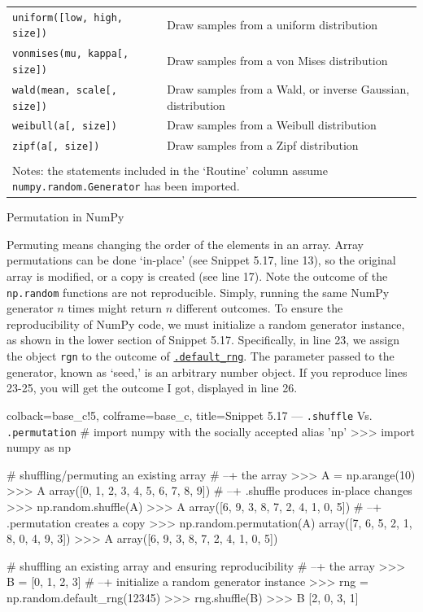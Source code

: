 \documentclass[a4paper,11pt]{book}
\newcommand{\question}[1]{%
    \begin{tcolorbox}[colback=comp_c!10,colframe=comp_c,sidebyside align=top,width=\linewidth,before skip=1ex]
        #1
    \end{tcolorbox}
    \switchcolumn%
}
\newcommand{\note}[1]{%
    \begin{tcolorbox}[colback=white!0,colframe=white!10,width=\linewidth,before skip=1ex]
        #1
    \end{tcolorbox}
}
\begin{document}
\begin{table}
\begin{tabular}{lp{12cm}}
\texttt{uniform([low, high, size])} &
                        Draw samples from a uniform distribution\\
\texttt{vonmises(mu, kappa[, size])} &
                        Draw samples from a von Mises distribution\\
\texttt{wald(mean, scale[, size])} &
                        Draw samples from a Wald, or inverse Gaussian, distribution\\
\texttt{weibull(a[, size])} &
                        Draw samples from a Weibull distribution\\
\texttt{zipf(a[, size])} &
                        Draw samples from a Zipf distribution\\
	     	\bottomrule \\[-1.8ex]
	        \multicolumn{2}{l}{Notes: the statements included in the `Routine' column assume \texttt{numpy.random.Generator} has been imported.} \\
	\end{tabular}
\end{table}
\clearpage

\begin{paracol}{2}
	\question{\raggedright Permutation in NumPy}
	\note{Permuting means changing the order of the elements in an array. Array permutations can be done `in-place' (see Snippet 5.17, line 13), so the original array is modified, or a copy is created (see line 17). Note the outcome of the \texttt{np.random} functions are not reproducible. Simply, running the same NumPy generator $n$ times might return $n$ different outcomes. To ensure the reproducibility of NumPy code, we must initialize a random generator instance, as shown in the lower section of Snippet 5.17. Specifically, in line 23, we assign the object \texttt{rgn} to the outcome of \href{https://numpy.org/doc/stable/reference/random/generator.html#numpy.random.Generator}{\texttt{.default\_rng}}. The parameter passed to the generator, known as `seed,' is an arbitrary number object. If you reproduce lines 23-25, you will get the outcome I got, displayed in line 26.}
\end{paracol}

\begin{pythoncode}[linenos=true,]{colback=base_c!5, colframe=base_c, title=\sffamily Snippet 5.17 --- \texttt{.shuffle} Vs. \texttt{.permutation}}
# import numpy with the socially accepted alias 'np'
>>> import numpy as np

# shuffling/permuting an existing array
# --+ the array
>>> A = np.arange(10)
>>> A
array([0, 1, 2, 3, 4, 5, 6, 7, 8, 9])
# --+ .shuffle produces in-place changes
>>> np.random.shuffle(A)
>>> A
array([6, 9, 3, 8, 7, 2, 4, 1, 0, 5])
# --+ .permutation creates a copy
>>> np.random.permutation(A)
array([7, 6, 5, 2, 1, 8, 0, 4, 9, 3])
>>> A
array([6, 9, 3, 8, 7, 2, 4, 1, 0, 5])

# shuffling an existing array and ensuring reproducibility
# --+ the array
>>> B = [0, 1, 2, 3]
# --+ initialize a random generator instance
>>> rng = np.random.default_rng(12345)
>>> rng.shuffle(B)
>>> B
[2, 0, 3, 1]
\end{pythoncode}
\clearpage
\end{document}
